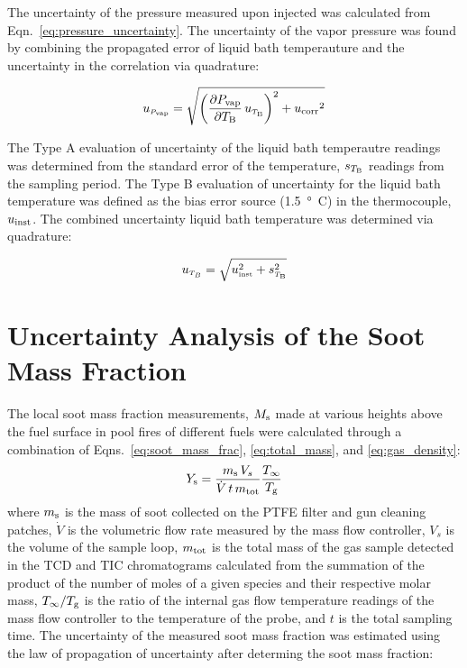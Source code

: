 \documentclass[12pt]{article}
\begin{document}
The uncertainty of the pressure measured upon injected was calculated from Eqn.~\ref{eq:pressure_uncertainty}. The uncertainty of the vapor pressure was found by combining the propagated error of liquid bath temperauture and the uncertainty in the correlation via quadrature:

\begin{equation}
\label{eq:vapor_concentration_uncertainty}
u_{\scriptscriptstyle P_{\rm vap}} = \sqrt{{\left(\frac{\partial P_{\rm vap}}{\partial T_{\rm B}}\,u_{\scriptscriptstyle T_{\rm B}} \right)}^2+{u_{\rm corr}}^2}
\end{equation}

The Type A evaluation of uncertainty of the liquid bath temperautre readings was determined from the standard error of the temperature, $s_{T_{\rm B}}$ readings from the sampling period. The Type B evaluation of uncertainty for the liquid bath temperature was defined as the bias error source (\SI{1.5}{\degree C}) in the thermocouple, $u_{\rm inst}$. The combined uncertainty liquid bath temperature was determined via quadrature:

\begin{equation}
\label{eq:temp_bath_uncertainty}
u_{\scriptscriptstyle T_{B}} = \sqrt{u_{\rm \scriptscriptstyle inst}^2 + s_{\scriptscriptstyle T_{\rm B}}^2}
\end{equation}
\pagebreak

\section{Uncertainty Analysis of the Soot Mass Fraction} \label{sec:Uncertainty_Soot_Frac}
The local soot mass fraction measurements, $M_{\rm s}$ made at various heights above the fuel surface in pool fires of different fuels were calculated through a combination of Eqns.~\ref{eq:soot_mass_frac}, \ref{eq:total_mass}, and \ref{eq:gas_density}:
\begin{equation}\label{eq:overall_soot_mass_frac}
Y_{\rm s}= \frac{m_{\rm s} \, V_{s}}{\dot{V} \, t \, m_{\rm tot}}\frac{T_{\rm \infty}}{T_{\rm g}}
\end{equation}
where $m_{\rm s}$ is the mass of soot collected on the PTFE filter and gun cleaning patches, $\dot{V}$ is the volumetric flow rate measured by the mass flow controller, $V_{s}$ is the volume of the sample loop, $m_{\rm tot}$ is the total mass of the gas sample detected in the TCD and TIC chromatograms calculated from the summation of the product of the number of moles of a given species and their respective molar mass, $T_{\rm \infty}/T_{\rm g}$ is the ratio of the internal gas flow temperature readings of the mass flow controller to the temperature of the probe, and $t$ is the total sampling time. The uncertainty of the measured soot mass fraction was estimated using the law of propagation of uncertainty after determing the soot mass fraction:
\end{document}
